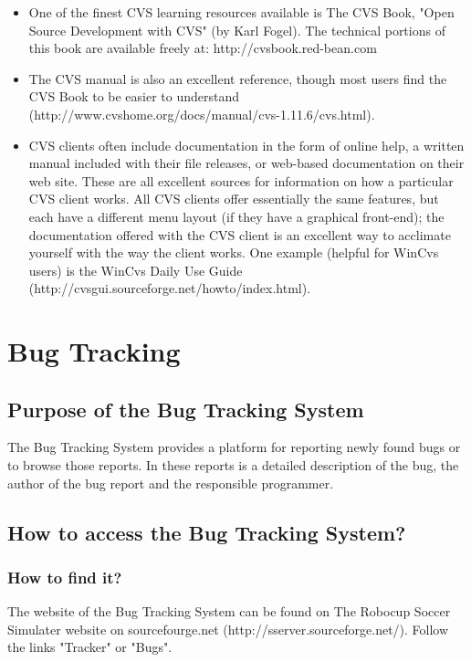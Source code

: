 \begin{itemize}
\item One of the finest CVS learning resources available is The CVS Book, "Open Source Development with CVS" (by Karl Fogel). The technical portions of this book are available freely at: http://cvsbook.red-bean.com
\item The CVS manual is also an excellent reference, though most users find the CVS Book to be easier to understand (http://www.cvshome.org/docs/manual/cvs-1.11.6/cvs.html).
\item CVS clients often include documentation in the form of online help, a written manual included with their file releases, or web-based documentation on their web site. These are all excellent sources for information on how a particular CVS client works. All CVS clients offer essentially the same features, but each have a different menu layout (if they have a graphical front-end); the documentation offered with the CVS client is an excellent way to acclimate yourself with the way the client works. One example (helpful for WinCvs users) is the WinCvs Daily Use Guide (http://cvsgui.sourceforge.net/howto/index.html). 
\end{itemize}

\section{Bug Tracking}

\subsection{Purpose of the Bug Tracking System}

The Bug Tracking System provides a platform for reporting newly found bugs or to
browse those reports. In these reports is a detailed description of the bug, the author of the bug report and the responsible programmer.

\subsection{How to access the Bug Tracking System?}

\subsubsection{How to find it?}

The website of the Bug Tracking System can be found on The Robocup Soccer Simulater website on sourcefourge.net (http://sserver.sourceforge.net/). Follow the links "Tracker" or "Bugs".

